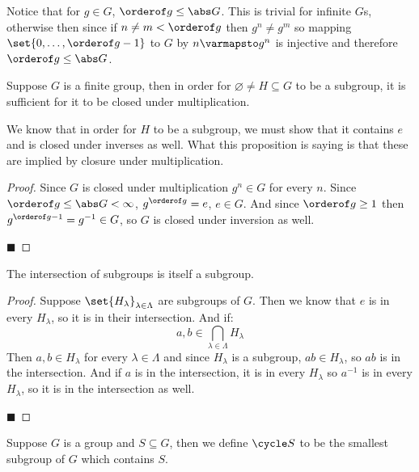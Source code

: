 \documentclass[10pt]{article}
\begin{document}
Notice that for $g\in G$, $\orderof g\leq\abs G$.
This is trivial for infinite $G$s, otherwise then since if $n\neq m<\orderof g$ then $g^n\neq g^m$ so mapping $\set{0,\dots,\orderof g-1}$ to $G$ by $n\varmapsto g^n$ is
injective and therefore $\orderof g\leq\abs G$.

\begin{prop*}

    Suppose $G$ is a finite group, then in order for $\varnothing\neq H\subseteq G$ to be a subgroup, it is sufficient for it to be closed under multiplication.

\end{prop*}

We know that in order for $H$ to be a subgroup, we must show that it contains $e$ and is closed under inverses as well.
What this proposition is saying is that these are implied by closure under multiplication.

\begin{proof}

    Since $G$ is closed under multiplication $g^n\in G$ for every $n$.
    Since $\orderof g\leq\abs G<\infty$, $g^{\orderof g}=e$, $e\in G$.
    And since $\orderof g\geq1$ then $g^{\orderof g-1}=g^{-1}\in G$, so $G$ is closed under inversion as well.

    \hfill$\blacksquare$

\end{proof}

\begin{prop*}

    The intersection of subgroups is itself a subgroup.

\end{prop*}

\begin{proof}

    Suppose $\set{H_\lambda}_{\lambda\in\Lambda}$ are subgroups of $G$.
    Then we know that $e$ is in every $H_\lambda$, so it is in their intersection.
    And if:
        \[ a,b\in\bigcap_{\lambda\in\Lambda} H_\lambda \]
    Then $a,b\in H_\lambda$ for every $\lambda\in\Lambda$ and since $H_\lambda$ is a subgroup, $ab\in H_\lambda$, so $ab$ is in the intersection.
    And if $a$ is in the intersection, it is in every $H_\lambda$ so $a^{-1}$ is in every $H_\lambda$, so it is in the intersection as well.

    \hfill$\blacksquare$

\end{proof}

\begin{defn*}

    Suppose $G$ is a group and $S\subseteq G$, then we define $\cycle S$ to be the smallest subgroup of $G$ which contains $S$.

\end{defn*}
\end{document}
